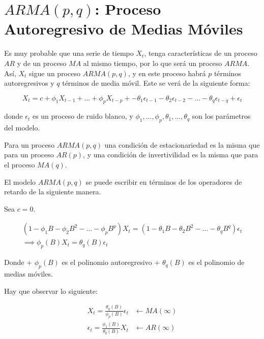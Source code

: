 \documentclass[
  a4paper,
  oneside,
  openany]{book}
\begin{document}
\hypertarget{armapq-proceso-autoregresivo-de-medias-muxf3viles}{%
\chapter{\texorpdfstring{\(ARMA(p,q)\): Proceso Autoregresivo de Medias Móviles}{ARMA(p,q): Proceso Autoregresivo de Medias Móviles}}\label{armapq-proceso-autoregresivo-de-medias-muxf3viles}}

Es muy probable que una serie de tiempo \(X_t\), tenga características de un proceso \(AR\) y de un proceso \(MA\) al mismo tiempo, por lo que será un proceso \(ARMA\). Así, \(X_t\) sigue un proceso \(ARMA(p,q)\), y en este proceso habrá \(p\) términos autoregresivos y \(q\) términos de media móvil. Este se verá de la siguiente forma:

\[
X_t=c+ \phi_1X_{t-1}+...+\phi_pX_{t-p}+-\theta_1\epsilon_{t-1}-\theta_2\epsilon_{t-2}-...-\theta_q\epsilon_{t-q}+\epsilon_t
\]

donde \(\epsilon_t\) es un proceso de ruido blanco, y \(\phi_1,...,\phi_p,\theta_1,...,\theta_q\) son los parámetros del modelo.

Para un proceso \(ARMA(p,q)\) una condición de estacionariedad es la misma que para un proceso \(AR(p)\), y una condición de invertivilidad es la misma que para el proceso \(MA(q)\).

El modelo \(ARMA(p,q)\) se puede escribir en términos de los operadores de retardo de la siguiente manera.

Sea \(c = 0\).

\[
\begin{array}{c}
(1-\phi_1B-\phi_2B^2-...-\phi_pB^p)X_t=(1-\theta_1B-\theta_2B^2-...-\theta_qB^q)\epsilon_t\\
\implies \phi_p(B)X_t=\theta_q(B)\epsilon_t
\end{array}
\]

Donde
+ \(\phi_p(B)\) es el polinomio autoregresivo
+ \(\theta_q(B)\) es el polinomio de medias móviles.

Hay que observar lo siguiente:

\[
\begin{array}{lr}
X_t = \frac{\theta_q(B)}{\phi_p(B)}\epsilon_t & \longleftarrow MA(\infty)\\
\epsilon_t = \frac{\phi_1(B)}{\theta_q(B)}X_t & \longleftarrow AR(\infty)
\end{array}
\]
\end{document}
